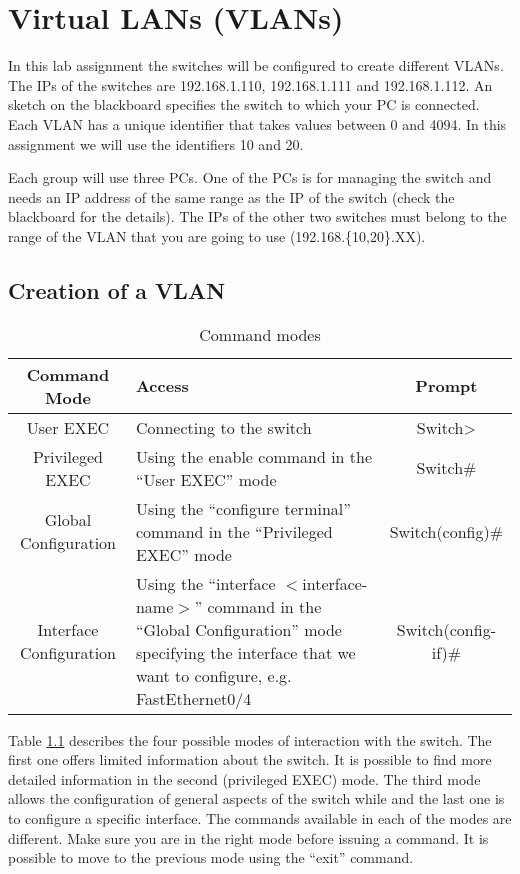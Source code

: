 \chapter{Virtual LANs (VLANs)}

In this lab assignment the switches will be configured to create different VLANs.
The IPs of the switches are 192.168.1.110, 192.168.1.111 and 192.168.1.112.
An sketch on the blackboard specifies the switch to which your PC is connected.
Each VLAN has a unique identifier that takes values between 0 and 4094.
In this assignment we will use the identifiers 10 and 20.


Each group will use three PCs.
One of the PCs is for managing the switch and needs an IP address of the same range as the IP of the switch (check the blackboard for the details).
The IPs of the other two switches must belong to the range of the VLAN that you are going to use (192.168.\{10,20\}.XX).


\section{Creation of a VLAN}

\begin{table}[!t]
\renewcommand{\arraystretch}{1.3}
\caption{Command modes}
\label{tab:modes}
\centering
\begin{tabular}{|c|p{5cm}|c|}
\hline
Command Mode & Access & Prompt\\
\hline
User EXEC & Connecting to the switch & Switch> \\
Privileged EXEC & Using the enable command in the ``User EXEC'' mode & Switch\# \\
Global Configuration & Using the ``configure terminal'' command in the ``Privileged EXEC'' mode& Switch(config)\# \\
        Interface Configuration & Using the ``interface $<$interface-name$>$'' command in the ``Global Configuration'' mode specifying the interface that we want to configure, e.g. FastEthernet0/4& Switch(config-if)\# \\
\hline
\end{tabular}
\end{table}


Table \ref{tab:modes} describes the four possible modes of interaction with the switch.
The first one offers limited information about the switch.
It is possible to find more detailed information in the second (privileged EXEC) mode.
The third mode allows the configuration of general aspects of the switch while and the last one is to configure a specific interface.
The commands available in each of the modes are different.
Make sure you are in the right mode before issuing a command.
It is possible to move to the previous mode using the ``exit'' command.

